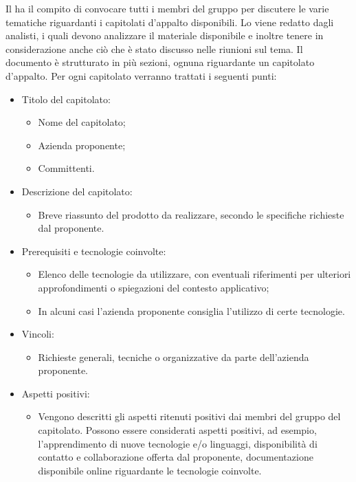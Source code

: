 Il \Responsabile{} ha il compito di convocare tutti i membri del gruppo \Gruppo{} per discutere le varie tematiche riguardanti i capitolati d'appalto disponibili.
Lo \SdF{} viene redatto dagli analisti, i quali devono analizzare il materiale disponibile e inoltre tenere in considerazione anche ciò che è stato discusso nelle riunioni sul tema.
Il documento è strutturato in più sezioni, ognuna riguardante un capitolato d'appalto.
Per ogni capitolato verranno trattati i seguenti punti:
\begin{itemize}
\item Titolo del capitolato:
	\begin{itemize}
	\item Nome del capitolato;
	\item Azienda proponente;
	\item Committenti.
	\end{itemize}
\item Descrizione del capitolato:
	\begin{itemize}
	\item Breve riassunto del prodotto da realizzare, secondo le specifiche richieste dal proponente.
	\end{itemize}
\item Prerequisiti e tecnologie coinvolte:
	\begin{itemize}
	\item Elenco delle tecnologie da utilizzare, con eventuali riferimenti per ulteriori approfondimenti o spiegazioni del contesto applicativo;
	\item In alcuni casi l'azienda proponente consiglia l'utilizzo di certe tecnologie.
	\end{itemize}
\item Vincoli:
	\begin{itemize}
	\item Richieste generali, tecniche o organizzative da parte dell'azienda proponente.
	\end{itemize}
\item Aspetti positivi:
	\begin{itemize}
	\item Vengono descritti gli aspetti ritenuti positivi dai membri del gruppo \Gruppo{} del capitolato.
	Possono essere considerati aspetti positivi, ad esempio, l'apprendimento di nuove tecnologie e/o linguaggi, disponibilità di contatto e collaborazione offerta dal proponente, documentazione disponibile online riguardante le tecnologie coinvolte.
	\end{itemize}

\end{itemize}
